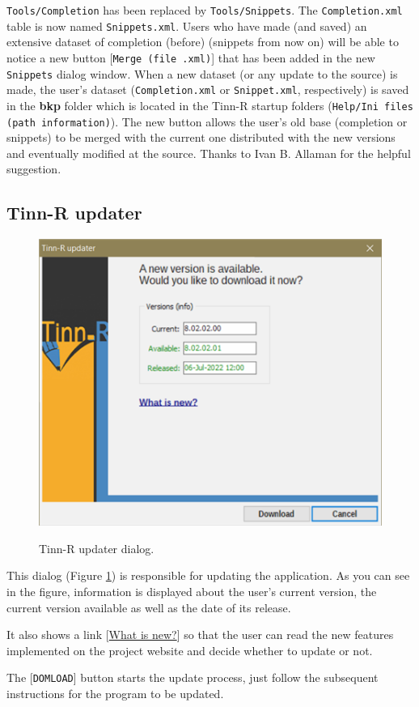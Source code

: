 \texttt{Tools/Completion} has been replaced by \texttt{Tools/Snippets}. The \texttt{Completion.xml}
table is now named \texttt{Snippets.xml}. Users who have made (and saved) an extensive dataset of completion
(before) (snippets from now on) will be able to notice a new button [\texttt{Merge (file .xml)}] that has been added
in the new \texttt{Snippets} dialog window. When a new dataset (or any update to the source) is made,
the user's dataset (\texttt{Completion.xml} or \texttt{Snippet.xml}, respectively) is saved in the \textbf{bkp} folder which is located
in the Tinn-R startup folders (\texttt{Help/Ini files (path information)}). The new button allows the user's old base
(completion or snippets) to be merged with the current one distributed with the new versions and eventually
modified at the source. Thanks to Ivan B. Allaman for the helpful suggestion.


\hypertarget{dlg_working_updater}{}
\subsection{Tinn-R updater}

\begin{figure}[H]
  \includegraphics[scale=1]{./res/dlg_updater.png} \\
  \caption{Tinn-R updater dialog.}
  \label{fig:dlg_updater}
\end{figure}
This dialog
(Figure \ref{fig:dlg_updater})
is responsible for updating the application. As you can see in the figure, information is displayed
about the user's current version, the current version available as well as the date of its release.

It also shows a link [\href{https://tinn-r.org/en/download#patch}{What is new?}] so that the user can read the new features implemented on the
project website and decide whether to update or not.

The [\texttt{DOMLOAD}] button starts the update process, just follow the subsequent instructions for the program
to be updated.
